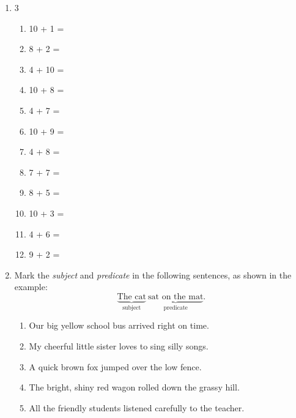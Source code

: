 \documentclass{tufte-book}
\begin{document}
\begin{enumerate}
  \item
    \begin{multicols}{3}
      \begin{enumerate}\bigskip
        \item 10 + 1 = \dotfill\bigskip
        \item 8 + 2 = \dotfill\bigskip
        \item 4 + 10 = \dotfill\bigskip
        \item 10 + 8 = \dotfill
        \item 4 + 7 = \dotfill\bigskip
        \item 10 + 9 = \dotfill\bigskip
        \item 4 + 8 = \dotfill\bigskip
        \item 7 + 7 = \dotfill
        \item 8 + 5 = \dotfill\bigskip
        \item 10 + 3 = \dotfill\bigskip
        \item 4 + 6 = \dotfill\bigskip
        \item 9 + 2 = \dotfill
      \end{enumerate}
  \end{multicols}

  \item Mark the \textit{subject} and \textit{predicate} in the following sentences, as shown in the example:
  $$\underbrace{\text{The cat}}_{\text{subject}} \  \underbrace{\text{sat on the mat}}_{\text{predicate}}.$$
    \begin{enumerate}
    \item Our big yellow school bus arrived right on time.\bigskip\bigskip
    \item My cheerful little sister loves to sing silly songs.\bigskip\bigskip
    \item A quick brown fox jumped over the low fence.\bigskip\bigskip
    \item The bright, shiny red wagon rolled down the grassy hill.\bigskip\bigskip
    \item All the friendly students listened carefully to the teacher.\bigskip\bigskip
  \end{enumerate}


\end{enumerate}
\end{document}
